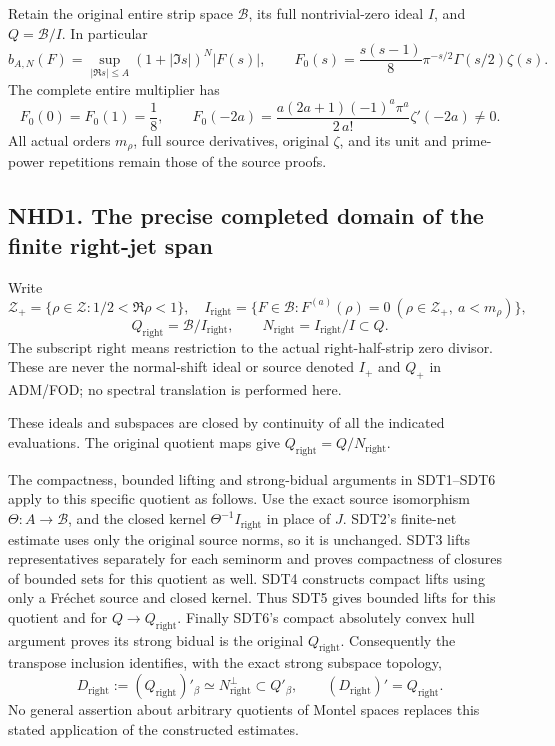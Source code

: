 Retain the original entire strip space \(\mathcal B\), its full
nontrivial-zero ideal \(I\), and \(Q=\mathcal B/I\). In particular \[
b_{A,N}(F)=\sup_{|\Re s|\le A}(1+|\Im s|)^N|F(s)|,
\qquad
F_0(s)=\frac{s(s-1)}8\pi^{-s/2}\Gamma(s/2)\zeta(s).
\tag{NHD0.1}
\] The complete entire multiplier has \[
F_0(0)=F_0(1)=\frac18,
\qquad
F_0(-2a)=\frac{a(2a+1)(-1)^a\pi^a}{2\,a!}\zeta'(-2a)\ne0.
\tag{NHD0.2}
\] All actual orders \(m_\rho\), full source derivatives, original
\(\zeta\), and its unit and prime-power repetitions remain those of the
source proofs.

\subsection{NHD1. The precise completed domain of the finite right-jet
span}\label{nhd1.-the-precise-completed-domain-of-the-finite-right-jet-span}

Write \[
\mathscr Z_+=\{\rho\in\mathscr Z:1/2<\Re\rho<1\},
\quad
I_{\mathrm{right}}=\{F\in\mathcal B:F^{(a)}(\rho)=0\ (\rho\in\mathscr Z_+,\ a<m_\rho)\},
\] \[
Q_{\mathrm{right}}=\mathcal B/I_{\mathrm{right}},\qquad N_{\mathrm{right}}=I_{\mathrm{right}}/I\subset Q.
\tag{NHD1.1}
\] The subscript \(\mathrm{right}\) means restriction to the actual
right-half-strip zero divisor. These are never the normal-shift ideal or
source denoted \(I_+\) and \(Q_+\) in ADM/FOD; no spectral translation
is performed here.

These ideals and subspaces are closed by continuity of all the indicated
evaluations. The original quotient maps give
\(Q_{\mathrm{right}}=Q/N_{\mathrm{right}}\).

The compactness, bounded lifting and strong-bidual arguments in
SDT1--SDT6 apply to this specific quotient as follows. Use the exact
source isomorphism \(\Theta:A\to\mathcal B\), and the closed kernel
\(\Theta^{-1}I_{\mathrm{right}}\) in place of \(J\). SDT2's finite-net
estimate uses only the original source norms, so it is unchanged. SDT3
lifts representatives separately for each seminorm and proves
compactness of closures of bounded sets for this quotient as well. SDT4
constructs compact lifts using only a Fréchet source and closed kernel.
Thus SDT5 gives bounded lifts for this quotient and for
\(Q\to Q_{\mathrm{right}}\). Finally SDT6's compact absolutely convex
hull argument proves its strong bidual is the original
\(Q_{\mathrm{right}}\). Consequently the transpose inclusion identifies,
with the exact strong subspace topology, \[
D_{\mathrm{right}}:=(Q_{\mathrm{right}})'_\beta\simeq
N_{\mathrm{right}}^\perp\subset Q'_\beta,
\qquad (D_{\mathrm{right}})'=Q_{\mathrm{right}}.
\tag{NHD1.2}
\] No general assertion about arbitrary quotients of Montel spaces
replaces this stated application of the constructed estimates.

